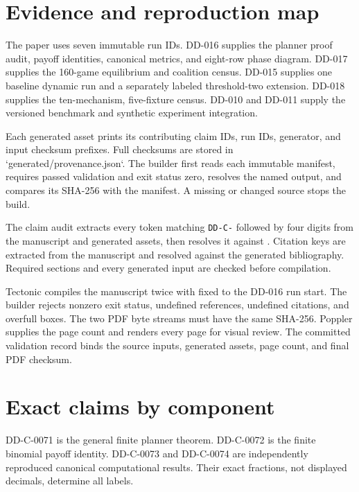 \documentclass[11pt]{article}
\begin{document}
\appendix

\section{Evidence and reproduction map}

The paper uses seven immutable run IDs. DD-016 supplies the planner proof audit,
payoff identities, canonical metrics, and eight-row phase diagram. DD-017
supplies the 160-game equilibrium and coalition census. DD-015 supplies one
baseline dynamic run and a separately labeled threshold-two extension. DD-018
supplies the ten-mechanism, five-fixture census. DD-010 and DD-011 supply the
versioned benchmark and synthetic experiment integration.

Each generated asset prints its contributing claim IDs, run IDs, generator,
and input checksum prefixes. Full checksums are stored in
`generated/provenance.json`. The builder first reads each immutable manifest,
requires passed validation and exit status zero, resolves the named output, and
compares its SHA-256 with the manifest. A missing or changed source stops the
build.

The claim audit extracts every token matching \texttt{DD-C-} followed by four digits
from the manuscript and generated assets, then resolves it against
. Citation keys are extracted from the manuscript and
resolved against the generated bibliography. Required sections and every
generated input are checked before compilation.

Tectonic compiles the manuscript twice with  fixed to the
DD-016 run start. The builder rejects nonzero exit status, undefined references,
undefined citations, and overfull boxes. The two PDF byte streams must have the
same SHA-256. Poppler supplies the page count and renders every page for visual
review. The committed validation record binds the source inputs, generated
assets, page count, and final PDF checksum.

\section{Exact claims by component}

DD-C-0071 is the general finite planner theorem. DD-C-0072 is the finite
binomial payoff identity. DD-C-0073 and DD-C-0074 are independently reproduced
canonical computational results. Their exact fractions, not displayed
decimals, determine all labels.
\end{document}
